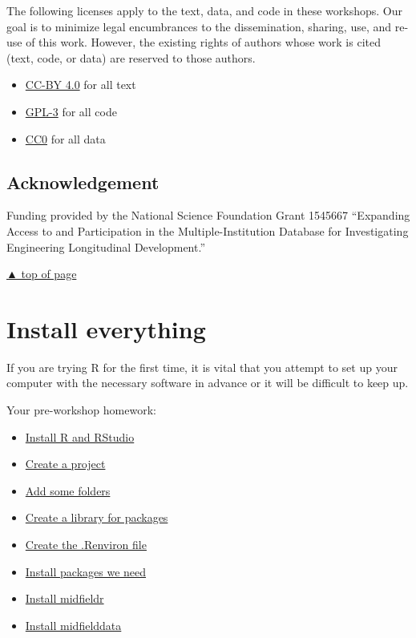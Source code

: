 \documentclass[
]{book}
\providecommand{\tightlist}{%
  \setlength{\itemsep}{0pt}\setlength{\parskip}{0pt}}
\begin{document}
The following licenses apply to the text, data, and code in these workshops. Our goal is to minimize legal encumbrances to the dissemination, sharing, use, and re-use of this work. However, the existing rights of authors whose work is cited (text, code, or data) are reserved to those authors.

\begin{itemize}
\tightlist
\item
  \href{https://creativecommons.org/licenses/by/4.0/legalcode}{CC-BY 4.0} for all text\\
\item
  \href{https://www.r-project.org/Licenses/GPL-3}{GPL-3} for all code\\
\item
  \href{https://wiki.creativecommons.org/wiki/CC0_use_for_data}{CC0} for all data
\end{itemize}

\hypertarget{acknowledgement}{%
\section{Acknowledgement}\label{acknowledgement}}

Funding provided by the National Science Foundation Grant 1545667 ``Expanding Access to and Participation in the Multiple-Institution Database for Investigating Engineering Longitudinal Development.''

\protect\hyperlink{introduction}{▲ top of page}

\hypertarget{install-everything}{%
\chapter{Install everything}\label{install-everything}}

If you are trying R for the first time, it is vital that you attempt to set up your computer with the necessary software in advance or it will be difficult to keep up.

Your pre-workshop homework:

\begin{itemize}
\tightlist
\item
  \protect\hyperlink{install-r-and-rstudio}{Install R and RStudio}
\item
  \protect\hyperlink{create-a-project}{Create a project}\\
\item
  \protect\hyperlink{add-some-folders}{Add some folders}
\item
  \protect\hyperlink{create-a-library-for-packages}{Create a library for packages}
\item
  \protect\hyperlink{create-the-.renviron-file}{Create the .Renviron file}
\item
  \protect\hyperlink{install-packages-we-need}{Install packages we need}
\item
  \protect\hyperlink{install-midfieldr}{Install midfieldr}
\item
  \protect\hyperlink{install-midfielddata}{Install midfielddata}
\end{itemize}
\end{document}
